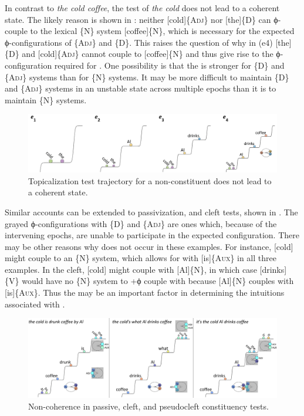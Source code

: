   In contrast to \textit{the cold coffee}, the  test of \textit{the cold} does not lead to a coherent state. The likely reason is shown in {}: neither [cold]\{A\textsc{dj}\} nor [the]\{D\} can ϕ-couple to the lexical \{N\} system [coffee]\{N\}, which is necessary for the expected ϕ-con\-fi\-gu\-ra\-tions of \{A\textsc{dj}\} and \{D\}. This raises the question of why in (e4) [the]\{D\} and [cold]\{A\textsc{dj}\} cannot couple to [coffee]\{N\} and thus give rise to the ϕ-con\-fi\-gu\-ra\-tion required for . One possibility is that the  is stronger for \{D\} and \{A\textsc{dj}\} systems than for \{N\} systems. It may be more difficult to maintain \{D\} and \{A\textsc{dj}\} systems in an unstable state across multiple epochs than it is to maintain \{N\} systems.

  
\begin{figure}
\includegraphics[width=\textwidth]{figures/Tilsen-img139.png}
\caption{Topicalization test trajectory for a non-constituent does not lead to a coherent state.}
\label{fig:6:20}
\end{figure}
 

  Similar accounts can be extended to passivization,  and cleft tests, shown in {}. The grayed ϕ-con\-fi\-gu\-ra\-tions with \{D\} and \{A\textsc{dj}\} are ones which, because of the intervening epochs, are unable to participate in the expected configuration. There may be other reasons why  does not occur in these examples. For instance, [cold] might couple to an \{N\} system, which allows for  with [is]\{A\textsc{ux}\} in all three examples. In the cleft, [cold] might couple with [Al]\{N\}, in which case [drinks]\{V\} would have no \{N\} system to +ϕ couple with because [Al]\{N\} couples with [is]\{A\textsc{ux}\}. Thus the  may be an important factor in determining the  intuitions associated with .   

  
\begin{figure}
\includegraphics[width=\textwidth]{figures/Tilsen-img140.png}
\caption{Non-coherence in passive, cleft, and pseudocleft constituency tests.}
\label{fig:6:21}
\end{figure}
 

